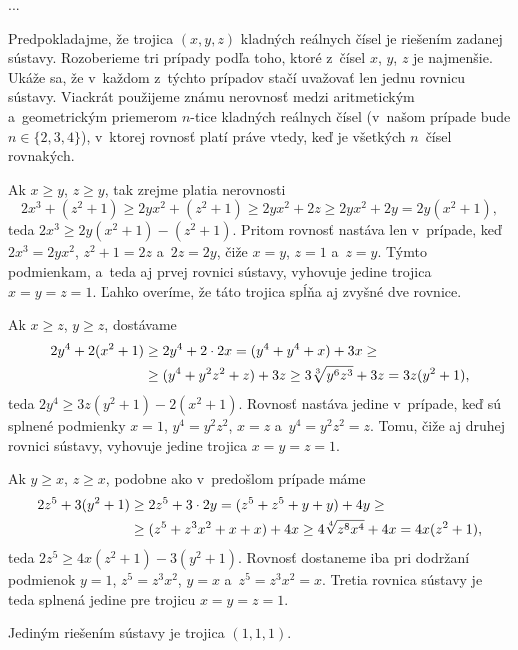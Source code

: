 {%
...}

{%
Predpokladajme, že trojica $(x,y,z)$ kladných reálnych čísel je riešením zadanej sústavy. Rozoberieme tri prípady podľa toho, ktoré z~čísel $x$, $y$, $z$ je najmenšie. Ukáže sa, že v~každom z~týchto prípadov stačí uvažovať len jednu rovnicu sústavy. Viackrát použijeme známu nerovnosť medzi aritmetickým a~geometrickým priemerom $n$-tice kladných reálnych čísel (v~našom prípade bude $n\in\{2,3,4\}$), v~ktorej rovnosť platí práve vtedy, keď je všetkých $n$~čísel rovnakých.

Ak $x\ge y$, $z\ge y$, tak zrejme platia nerovnosti
$$
2x^3+(z^2+1) \ge 2yx^2+(z^2+1) \ge 2yx^2+2z \ge 2yx^2+2y=2y(x^2+1),
$$
teda $2x^3\ge 2y(x^2+1)-(z^2+1)$. Pritom rovnosť nastáva len v~prípade, keď $2x^3=2yx^2$, $z^2+1=2z$ a~$2z=2y$, čiže $x=y$, $z=1$ a~$z=y$. Týmto podmienkam, a~teda aj prvej rovnici sústavy, vyhovuje jedine trojica $x=y=z=1$. Ľahko overíme, že táto trojica spĺňa aj zvyšné dve rovnice.

Ak $x\ge z$, $y\ge z$, dostávame
$$
\aligned
2y^4+2(x^2+1) &\ge 2y^4+2\cdot2x = (y^4+y^4+x)+3x \ge\\
              &\ge (y^4+y^2z^2+z)+3z \ge 3\root3\of{y^6z^3}+3z = 3z(y^2+1),
\endaligned
$$
teda $2y^4\ge 3z(y^2+1)-2(x^2+1)$. Rovnosť nastáva jedine v~prípade, keď sú splnené podmienky $x=1$, $y^4=y^2z^2$, $x=z$ a~$y^4=y^2z^2=z$. Tomu, čiže aj druhej rovnici sústavy, vyhovuje jedine trojica $x=y=z=1$.

Ak $y\ge x$, $z\ge x$, podobne ako v~predošlom prípade máme
$$
\aligned
2z^5+3(y^2+1) &\ge 2z^5+3\cdot2y = (z^5+z^5+y+y)+4y \ge\\
              &\ge (z^5+z^3x^2+x+x)+4x \ge 4\root4\of{z^8x^4}+4x = 4x(z^2+1),
\endaligned
$$
teda $2z^5\ge 4x(z^2+1)-3(y^2+1)$. Rovnosť dostaneme iba pri dodržaní podmienok $y=1$, $z^5=z^3x^2$, $y=x$ a~$z^5=z^3x^2=x$. Tretia rovnica sústavy je teda splnená jedine pre trojicu $x=y=z=1$.

\odpoved
Jediným riešením sústavy je trojica $(1,1,1)$.
}

